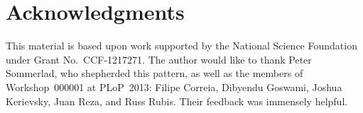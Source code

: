 \documentclass[prodmode]{acmlarge}
\begin{document}
\section*{Acknowledgments}
This material is based upon work supported by the National Science Foundation
under Grant No.~CCF-1217271.  The author would like to thank Peter Sommerlad,
who shepherded this pattern, as well as the members of Workshop~000001 at
PLoP~2013: Filipe Correia, Dibyendu Goswami, Joshua Kerievsky, Juan Reza, and
Russ Rubis.  Their feedback was immensely helpful.




\end{document}
